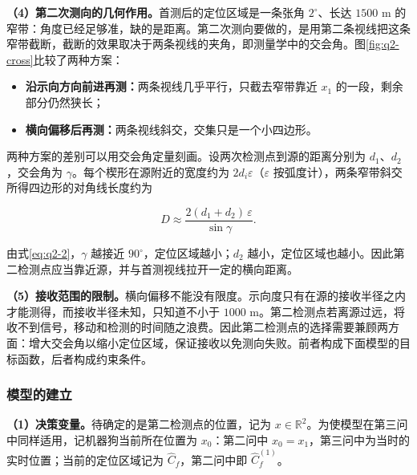 \textbf{（4）第二次测向的几何作用。}首测后的定位区域是一条张角 $2^\circ$、长达 $1500$ m 的窄带：角度已经足够准，缺的是距离。第二次测向要做的，是用第二条视线把这条窄带截断，截断的效果取决于两条视线的夹角，即测量学中的交会角。图\ref{fig:q2-cross}比较了两种方案：

\begin{itemize}
\item \textbf{沿示向方向前进再测：}两条视线几乎平行，只截去窄带靠近 $x_1$ 的一段，剩余部分仍然狭长；
\item \textbf{横向偏移后再测：}两条视线斜交，交集只是一个小四边形。
\end{itemize}

\begin{center}
\begin{minipage}{\linewidth}
\centering
\QTwoCrossFigure
{}
\label{fig:q2-cross}
\end{minipage}
\end{center}

两种方案的差别可以用交会角定量刻画。设两次检测点到源的距离分别为 $d_1$、$d_2$，交会角为 $\gamma$。每个楔形在源附近的宽度约为 $2d_i\varepsilon$（$\varepsilon$ 按弧度计），两条窄带斜交所得四边形的对角线长度约为

\begin{equation}\label{eq:q2-2}
D\approx\frac{2(d_1+d_2)\,\varepsilon}{\sin\gamma}.
\end{equation}

由式\eqref{eq:q2-2}，$\gamma$ 越接近 $90^\circ$，定位区域越小；$d_2$ 越小，定位区域也越小。因此第二检测点应当靠近源，并与首测视线拉开一定的横向距离。

\textbf{（5）接收范围的限制。}横向偏移不能没有限度。示向度只有在源的接收半径之内才能测得，而接收半径未知，只知道不小于 $1000$ m。第二检测点若离源过远，将收不到信号，移动和检测的时间随之浪费。因此第二检测点的选择需要兼顾两方面：增大交会角以缩小定位区域，保证接收以免测向失败。前者构成下面模型的目标函数，后者构成约束条件。

\subsubsection{模型的建立}\label{sec:q2-2}

\textbf{（1）决策变量。}待确定的是第二检测点的位置，记为 $x\in\mathbb R^2$。为使模型在第三问中同样适用，记机器狗当前所在位置为 $x_0$：第二问中 $x_0=x_1$，第三问中为当时的实时位置；当前的定位区域记为 $\widehat C_f$，第二问中即 $\widehat C_f^{(1)}$。

